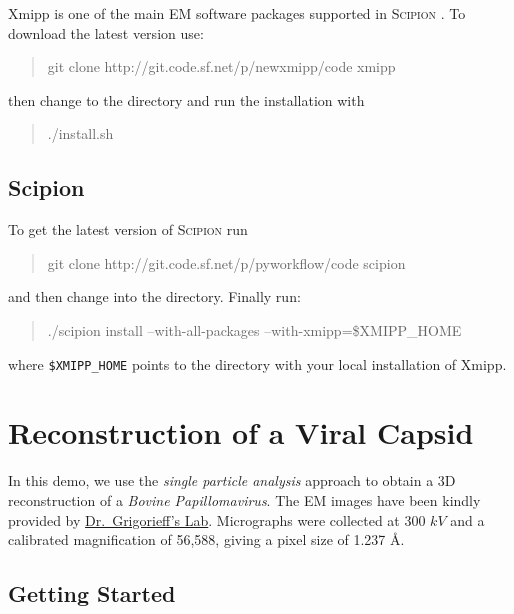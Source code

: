 \documentclass[12pt]{article} %
\newcommand{\scipion}{\textsc{Scipion} }
\newenvironment{command}{\tt\begin{quote}}{\end{quote}}
\begin{document}
Xmipp is one of the main EM software packages supported in \scipion. To download
the latest version use:

\begin{command}
git clone http://git.code.sf.net/p/newxmipp/code xmipp
\end{command}

\noindent
then change to the  directory and run the installation with

\begin{command}
./install.sh
\end{command}

\subsection{Scipion}

To get the latest version of \scipion run

\begin{command}
git clone http://git.code.sf.net/p/pyworkflow/code scipion
\end{command}

\noindent
and then change into the  directory. Finally run:

\begin{command}
./scipion install --with-all-packages --with-xmipp=\$XMIPP\_HOME
\end{command}

\noindent
where \verb+$XMIPP_HOME+ points to the directory with your local
installation of Xmipp.


\section{Reconstruction of a Viral Capsid}

In this demo, we use the \emph{single particle analysis} approach to obtain
a 3D reconstruction of a \emph{Bovine Papillomavirus}. The EM images have been kindly
provided by \href{http://grigoriefflab.janelia.org/}{Dr.~Grigorieff’s Lab}. Micrographs were
collected at 300 $kV$ and a calibrated magnification of 56,588,
giving a pixel
size of 1.237 \AA  \citep{Wolf2010}. 

\subsection{Getting Started}
\end{document}
